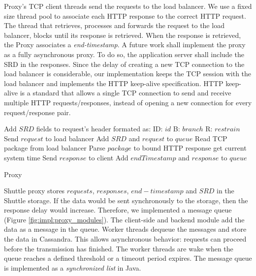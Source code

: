 Proxy's TCP client threads send the requests to the load balancer. We use a fixed size thread pool to associate each \ac{HTTP} response to the correct \ac{HTTP} request. The thread that retrieves, processes and forwards the request to the load balancer, blocks until its response is retrieved. When the response is retrieved, the Proxy associates a \emph{end-timestamp}. A future work shall implement the proxy as a fully asynchronous proxy. To do so, the application server shall include the \ac{SRD} in the responses. Since the delay of creating a new TCP connection to the load balancer is considerable, our implementation keeps the TCP session with the load balancer and implements the \ac{HTTP} keep-alive specification. \ac{HTTP} keep-alive is a standard that allows a single TCP connection to send and receive multiple \ac{HTTP} requests/responses, instead of opening a new connection for every request/response pair. 

\begin{algorithm}
	\DontPrintSemicolon{}
		\;
		\BlankLine 
		\;
		\;
		\; 
		Add $SRD$ fields to request's header formated as: \newline ID: $id$ \newline B: $branch$ \newline R: $restrain$\;
		Send $request$ to load balancer\;
		Add $SRD$ and $request$ to $queue$\;
		 {Read TCP package from load balancer}\;
		 {Parse $package$ to bound \ac{HTTP} response}\;
		 {get current system time}\;
		Send $response$ to client\;
		Add $endTimestamp$ and $response$ to $queue$\;
  	\caption{Proxy}
	\label{code:proxy_service}
\end{algorithm}



Shuttle proxy stores $requests$, $responses$, $end-timestamp$ and $SRD$ in the Shuttle storage. If the data would be sent synchronously to the storage, then the response delay would increase. Therefore, we implemented a message queue (Figure \ref{fig:impl:proxy_modules}). The client-side and backend module add the data as a message in the queue. Worker threads dequeue the messages and store the data in Cassandra. This allows asynchronous behavior: requests can proceed before the transmission has finished. The worker threads are wake when the queue reaches a defined threshold or a timeout period expires. The message queue is implemented as a \emph{synchronized list} in Java.


